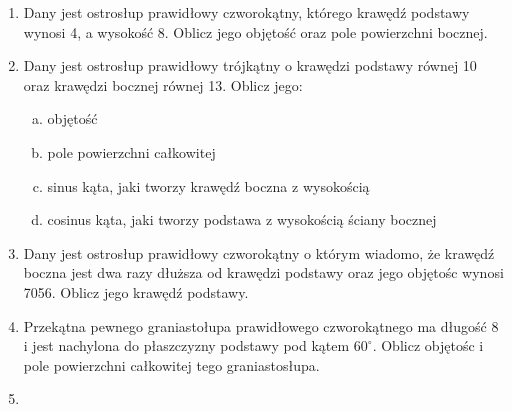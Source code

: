 \documentclass[12pt,a4paper]{article}
\begin{document}
\begin{enumerate}[1.]
	\item Dany jest ostrosłup prawidłowy czworokątny, którego krawędź podstawy wynosi 4, a wysokość 8. Oblicz jego objętość oraz pole powierzchni bocznej.
	
	\item Dany jest ostrosłup prawidłowy trójkątny o krawędzi podstawy równej 10 oraz krawędzi bocznej równej 13. Oblicz jego:
	\begin{enumerate}[a)]
		\item objętość
		\item pole powierzchni całkowitej
		\item sinus kąta, jaki tworzy krawędź boczna z wysokością
		\item cosinus kąta, jaki tworzy podstawa z wysokością ściany bocznej
	\end{enumerate}
	
	\item Dany jest ostrosłup prawidłowy czworokątny o którym wiadomo, że krawędź boczna jest dwa razy dłuższa od krawędzi podstawy oraz jego objętośc wynosi 7056. Oblicz jego krawędź podstawy.
	
	\item Przekątna pewnego graniastołupa prawidłowego czworokątnego ma długość 8 i jest nachylona do płaszczyzny podstawy pod kątem $60^\circ$. Oblicz objętośc i pole powierzchni całkowitej tego graniastosłupa.
	
	\item 

	\end{enumerate}
\end{document}
